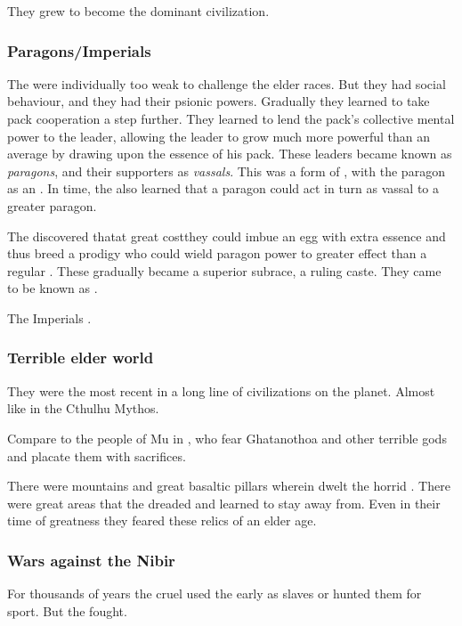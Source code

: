 They grew to become the dominant civilization. 





\subsubsection{Paragons/Imperials}
The \ophidians were individually too weak to challenge the elder races. 
But they had social behaviour, and they had their psionic powers. 
Gradually they learned to take pack cooperation a step further. 
They learned to lend the pack's collective mental power to the leader, allowing the leader to grow much more powerful than an average \ophidian by drawing upon the essence of his pack.
These leaders became known as \emph{paragons}, and their supporters as \emph{vassals}.
This was a form of \emph{\nexus}, with the paragon as an \emph{\apex}. 
In time, the \ophidians also learned that a paragon could act in turn as vassal to a greater paragon. 

The \ophidians discovered that\dash at great cost\dash they could imbue an egg with extra essence and thus breed a prodigy who could wield paragon power to greater effect than a regular \ophidian. 
These  gradually became a superior subrace, a ruling caste. 
They came to be known as .

The \ophidian Imperials . 





\subsubsection{Terrible elder world}
They were the most recent in a long line of civilizations on the planet. 
Almost like \humans in the Cthulhu Mythos. 

Compare to the people of Mu in \cite{HPLovecraft:OutoftheAeons}, who fear Ghatanothoa and other terrible gods and placate them with sacrifices. 

There were mountains and great basaltic pillars wherein dwelt the horrid . 
There were great areas that the \ophidians dreaded and learned to stay away from.
Even in their time of greatness they feared these relics of an elder age. 





\subsubsection{Wars against the Nibir}
For thousands of years the cruel  used the early \ophidians as slaves or hunted them for sport. 
But the \ophidians fought. 

